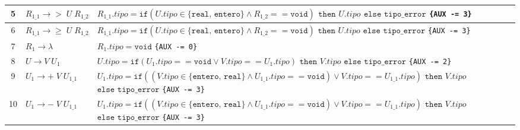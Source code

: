 \documentclass{article}
\begin{document}
\begin{longtable}{|c|>{\raggedright\arraybackslash}p{5.5cm}|>{\raggedright\arraybackslash}p{10cm}|}
5 & $R_{1\_1} \to > \; U \; R_{1\_2}$ & 
$R_{1\_1}.tipo = \texttt{if}(U.tipo \in \{\texttt{real, entero}\} \land R_{1\_2} == \texttt{void})$ \newline
\hspace*{0.5cm} $\texttt{then } U.tipo$ \newline
\hspace*{0.5cm} $\texttt{else tipo\_error}$ \newline
\texttt{\{AUX -= 3\}} \\ \hline

6 & $R_{1\_1} \to \ge \; U \; R_{1\_2}$ & 
$R_{1\_1}.tipo = \texttt{if}(U.tipo \in \{\texttt{real, entero}\} \land R_{1\_2} == \texttt{void})$ \newline
\hspace*{0.5cm} $\texttt{then } U.tipo$ \newline
\hspace*{0.5cm} $\texttt{else tipo\_error}$ \newline
\texttt{\{AUX -= 3\}} \\ \hline

7 & $R_1 \to \lambda$ & 
$R_1.tipo = \texttt{void}$ \newline
\texttt{\{AUX -= 0\}} \\ \hline

8 & $U \to V \; U_1$ & 
$U.tipo = \texttt{if}(U_1.tipo == \texttt{void} \lor V.tipo == U_1.tipo)$ \newline
\hspace*{0.5cm} $\texttt{then } V.tipo$ \newline
\hspace*{0.5cm} $\texttt{else tipo\_error}$ \newline
\texttt{\{AUX -= 2\}} \\ \hline

9 & $U_1 \to + \; V \; U_{1\_1}$ & 
$U_1.tipo = \texttt{if}((V.tipo \in \{\texttt{entero, real}\} \land U_{1\_1}.tipo == \texttt{void}) \lor V.tipo == U_{1\_1}.tipo)$ \newline
\hspace*{0.5cm} $\texttt{then } V.tipo$ \newline
\hspace*{0.5cm} $\texttt{else tipo\_error}$ \newline
\texttt{\{AUX -= 3\}} \\ \hline

10 & $U_1 \to - \; V \; U_{1\_1}$ & 
$U_1.tipo = \texttt{if}((V.tipo \in \{\texttt{entero, real}\} \land U_{1\_1}.tipo == \texttt{void}) \lor V.tipo == U_{1\_1}.tipo)$ \newline
\hspace*{0.5cm} $\texttt{then } V.tipo$ \newline
\hspace*{0.5cm} $\texttt{else tipo\_error}$ \newline
\texttt{\{AUX -= 3\}} \\ \hline


\end{longtable}
\end{document}
